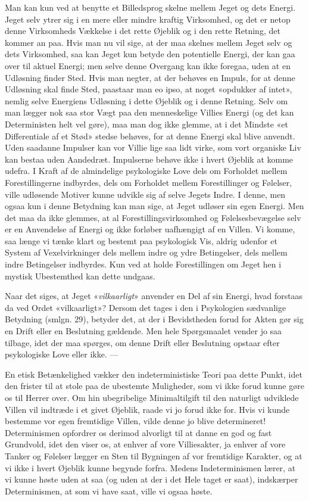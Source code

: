 \documentclass[12pt,a4paper,openany]{book}
\newcommand{\opage}[1]{\marginnote{\footnotesize\textit{[#1]}}}
\begin{document}
Man kan kun ved at benytte et Billedsprog skelne mellem Jeget og dets Energi.
Jeget selv ytrer sig i en mere eller mindre kraftig Virksomhed, og det er netop
denne Virksomheds Vækkelse i det rette Øjeblik og i den rette Retning, det
kommer an paa. Hvis man nu vil sige, at der maa skelnes mellem Jeget selv og
dets Virksomhed, saa kan Jeget kun betyde den potentielle Energi, der kan gaa
over til aktuel Energi; men selve denne Overgang kan ikke foregaa, uden at en
Udløsning finder Sted. Hvis man negter, at der behøves en Impuls, for at denne
Udløsning skal finde Sted, paastaar man eo ipso, at noget «opdukker af intet»,
nemlig selve Energiens Udløsning i dette Øjeblik og i denne Retning. Selv om
man lægger nok saa stor Vægt paa den menneskelige Villies Energi (og det kan
Deterministen helt vel gøre), maa man dog ikke glemme, at i det Mindste «et
Differentiale af et Stød» stedse behøves, for at denne Energi skal blive
anvendt. Uden saadanne Impulser kan vor Villie lige saa lidt virke, som vort
organiske Liv kan bestaa uden Aandedræt. Impulserne behøve ikke i hvert Øjeblik
at komme udefra. I Kraft af de almindelige psykologiske Love dels om Forholdet
mellem Forestillingerne indbyrdes, dels om Forholdet mellem Forestillinger og
Følelser, ville udløsende Motiver kunne udvikle sig af selve Jegets Indre. I
denne, men ogsaa kun i denne Betydning kan man sige, at Jeget udløser sin egen
Energi. Men det maa da ikke glemmes, at al Forestillingsvirksomhed og
Følelsesbevægelse selv er en Anvendelse af Energi og ikke forløber uafhængigt
af en Villen. Vi komme, saa længe vi tænke klart og bestemt paa psykologisk
Vis, aldrig udenfor et System af Vexelvirkninger dels mellem indre og ydre
Betingelser, dels mellem indre Betingelser indbyrdes. Kun ved at holde
Forestillingen om Jeget hen i mystisk Ubestemthed kan dette undgaas.

Naar det siges, at Jeget «\emph{vilkaarligt}» anvender en Del af sin Energi,
hvad forstaas da ved Ordet «vilkaarligt»? Dersom det tages i den i Psykologien
sædvanlige Betydning (smlgn. 29), betyder det, at der i Bevidstheden forud for
Akten gør sig en Drift eller en Beslutning gældende. Men hele Spørgsmaalet
vender jo saa tilbage, idet der maa spørges, om denne Drift eller Beslutning
opstaar efter psykologiske Love eller ikke. ---

En etisk Betænkelighed vækker den indeterministiske Teori paa dette Punkt, idet
den frister til at stole paa de ubestemte Muligheder, som vi ikke forud kunne
gøre os til
\setcounter{footnote}{0}%
\opage{102}Herrer over. Om hin ubegribelige Minimaltilgift til den naturligt
udviklede Villen vil indtræde i et givet Øjeblik, raade vi jo forud ikke for.
Hvis vi kunde bestemme vor egen fremtidige Villen, vilde denne jo blive
determineret! Determinismen opfordrer os derimod alvorligt til at danne en god
og fast Grundvold, idet den viser os, at enhver af vore Villiesakter, ja enhver
af vore Tanker og Følelser lægger en Sten til Bygningen af vor fremtidige
Karakter, og at vi ikke i hvert Øjeblik kunne begynde forfra. Medens
Indeterminismen lærer, at vi kunne høste uden at saa (og uden at der i det Hele
taget er saat), indskærper Determinismen, at som vi have saat, ville vi ogsaa høste.
\end{document}
